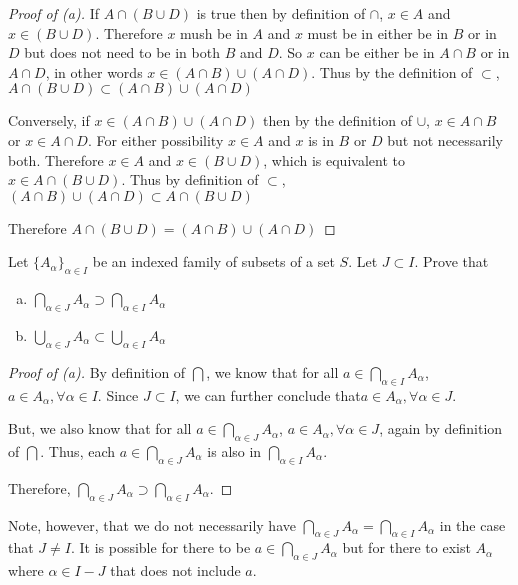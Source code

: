 \begin{proof}[Proof of (a)]
	If $A \cap (B \cup D)$ is true then by definition of $\cap$, $x \in A$ and $x \in (B \cup D)$. Therefore $x$ mush be in $A$ and $x$ must be in either
	be in $B$ or in $D$ but does not need to be in both $B$ and $D$. So $x$ can be either be in $A \cap B$ or in $A \cap D$, in other words $ x \in (A \cap B) \cup (A \cap D)$.
	Thus by the definition of $\subset$, $A \cap (B \cup D) \subset (A \cap B) \cup (A \cap D)$

	Conversely, if $x \in (A \cap B) \cup (A \cap D)$ then by the definition of $\cup$, $x \in A \cap B$ or $x \in A \cap D$. For either possibility $x \in A$ and $x$ is in
	$B$ or $D$ but not necessarily both. Therefore $x \in A$ and $x \in (B \cup D)$, which is equivalent to $x \in A \cap (B \cup D)$. Thus by definition of $\subset$,
	$(A \cap B) \cup (A \cap D) \subset A \cap (B \cup D)$

	Therefore $A \cap (B \cup D) = (A \cap B) \cup (A \cap D)$
\end{proof}

\begin{problem}[3]
	Let $\{A_\alpha\}_{\alpha \in I}$ be an indexed family of subsets of a set $S$. Let $J \subset I$. Prove that
	\begin{enumerate}[(a)]
		\item $\bigcap_{\alpha \in J} A_\alpha \supset \bigcap_{\alpha \in I} A_\alpha$
		\item $\bigcup_{\alpha \in J} A_\alpha \subset \bigcup_{\alpha \in I} A_\alpha$
	\end{enumerate}
\end{problem}


\begin{proof}[Proof of (a)]
	By definition of $\bigcap$, we know that for all $a \in \bigcap_{\alpha \in I} A_\alpha$, $a \in A_\alpha, \forall \alpha \in I$.
	Since $J \subset I$, we can further conclude that$a \in A_\alpha, \forall \alpha \in J$.

	But, we also know that for all $a \in \bigcap_{\alpha \in J} A_\alpha$, $a \in A_\alpha, \forall \alpha \in J$, again by definition of $\bigcap$.
	Thus, each $a \in \bigcap_{\alpha \in J} A_\alpha$ is also in $\bigcap_{\alpha \in I} A_\alpha$.

	Therefore, $\bigcap_{\alpha \in J} A_\alpha \supset \bigcap_{\alpha \in I} A_\alpha$.
\end{proof}

Note, however, that we do not necessarily have $\bigcap_{\alpha \in J} A_\alpha = \bigcap_{\alpha \in I} A_\alpha$ in the case that $J \neq I$.
It is possible for there to be $a \in \bigcap_{\alpha \in J} A_\alpha$ but for there to exist $A_\alpha$ where $\alpha \in I - J$ that does not include $a$.

